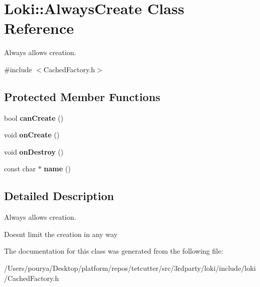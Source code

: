 \hypertarget{classLoki_1_1AlwaysCreate}{}\section{Loki\+:\+:Always\+Create Class Reference}
\label{classLoki_1_1AlwaysCreate}


Always allows creation.  




{\ttfamily \#include $<$Cached\+Factory.\+h$>$}

\subsection*{Protected Member Functions}
\begin{DoxyCompactItemize}
\item 
\hypertarget{classLoki_1_1AlwaysCreate_aac5cf849ab2569d52c4db1dcef257e90}{}bool {\bfseries can\+Create} ()\label{classLoki_1_1AlwaysCreate_aac5cf849ab2569d52c4db1dcef257e90}

\item 
\hypertarget{classLoki_1_1AlwaysCreate_a9d46a0472c0d9d740c23784aebe8752d}{}void {\bfseries on\+Create} ()\label{classLoki_1_1AlwaysCreate_a9d46a0472c0d9d740c23784aebe8752d}

\item 
\hypertarget{classLoki_1_1AlwaysCreate_a8273b409f4bb17992b96d37c4a613875}{}void {\bfseries on\+Destroy} ()\label{classLoki_1_1AlwaysCreate_a8273b409f4bb17992b96d37c4a613875}

\item 
\hypertarget{classLoki_1_1AlwaysCreate_a4f32a383b5651a0274bf4c6bcc70ebf2}{}const char $\ast$ {\bfseries name} ()\label{classLoki_1_1AlwaysCreate_a4f32a383b5651a0274bf4c6bcc70ebf2}

\end{DoxyCompactItemize}


\subsection{Detailed Description}
Always allows creation. 

Doesn\textquotesingle{}t limit the creation in any way 

The documentation for this class was generated from the following file\+:\begin{DoxyCompactItemize}
\item 
/\+Users/pourya/\+Desktop/platform/repos/tetcutter/src/3rdparty/loki/include/loki/Cached\+Factory.\+h\end{DoxyCompactItemize}
